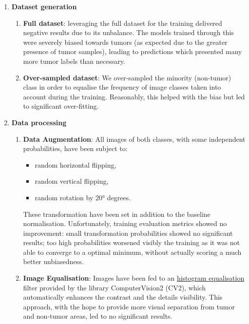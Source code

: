 \begin{enumerate}
    \item \textbf{Dataset generation}
    \begin{enumerate}
        \item \textbf{Full dataset}: leveraging the full dataset for the training delivered negative results due to its unbalance. The models trained through this were severely biased towards tumors (as expected due to the greater presence of tumor samples), leading to predictions which presented many more tumor labels than necessary.
        \item \textbf{Over-sampled dataset}:
        We over-sampled the minority (non-tumor) class in order to equalise the frequency of image classes taken into account during the training. Reasonably, this helped with the bias but led to significant over-fitting.

    \end{enumerate}

    \item \textbf{Data processing}

    \begin{enumerate}
        \item \textbf{Data Augmentation}:
        All images of both classes, with some independent probabilities, have been subject to:
        \begin{itemize}
            \item random horizontal flipping,
            \item random vertical flipping,
            \item random rotation by 20° degrees.
        \end{itemize}
        These transformation have been set in addition to the baseline normalisation. Unfortunately, training evaluation metrics showed no improvement: small transformation probabilities showed no significant results; too high probabilities worsened visibly the training as it was not able to converge to a optimal minimum, without actually scoring a much better unbiasedness.

        \item \textbf{Image Equalisation}:
        Images have been fed to an \uline{histogram equalisation} filter provided by the library ComputerVision2 (CV2), which automatically enhances the contrast and the details visibility. This approach, with the hope to provide more visual separation from tumor and non-tumor areas, led to no significant results.
    \end{enumerate}


\end{enumerate}
